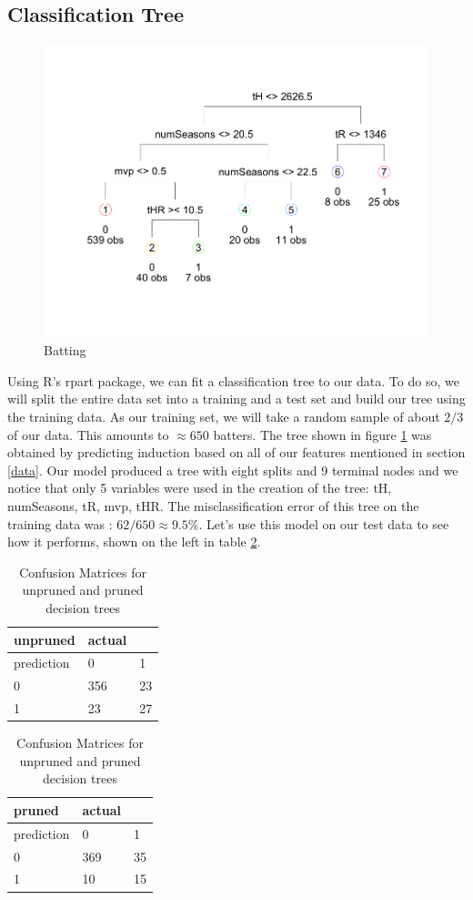 \documentclass[preprint,12pt]{elsarticle}
\begin{document}
\subsection{Classification Tree}
\begin{figure}[h]
       \centering 
       \includegraphics[width=0.8\linewidth]{BatterUnpruned}
       \caption{Batting}
       \label{unprunedBat}
 \end{figure}
Using R's rpart package, we can fit a classification tree to our data. To do so, we will split the entire data set into a training and a test set and build our tree using the training data. As our training set, we will take a random sample of about $2/3$ of our data. This amounts to $\approx 650$ batters. The tree shown in figure \ref{unprunedBat} was obtained by predicting induction based on all of our features mentioned in section \ref{data}. Our model produced a tree with eight splits and 9 terminal nodes and we notice that only 5 variables were used in the creation of the tree: tH, numSeasons, tR, mvp, tHR. The misclassification error of this tree on the training data was : $62/650 \approx 9.5\%$. Let's use this model on our test data to see how it performs, shown on the left in table \ref{conf}.

\begin{table}[h]
\centering
\begin{tabular}{|l |l l|}
\hline
 unpruned &  actual & \\
\hline
prediction & 0 & 1 \\
0 & 356 & 23 \\
1 & 23 & 27 \\
\hline
\end{tabular}
\quad
\begin{tabular}{|l |l l|}
\hline
 pruned &  actual & \\
\hline
prediction & 0 & 1 \\
0 & 369 & 35 \\
1 & 10 & 15 \\
\hline
\end{tabular}
\caption{Confusion Matrices for unpruned and pruned decision trees}
\label{conf}
\end{table}
\end{document}
